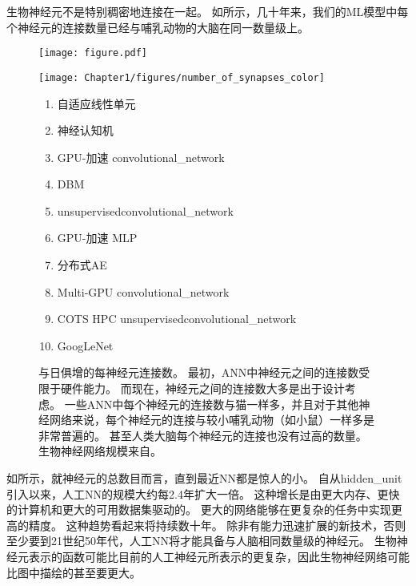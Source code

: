 生物神经元不是特别稠密地连接在一起。
如所示，几十年来，我们的\gls{ML}模型中每个神经元的连接数量已经与哺乳动物的大脑在同一数量级上。

\begin{figure}[!htb]
\ifOpenSource
\centerline{\texttt{[image: figure.pdf]}}
\else
\centerline{\texttt{[image: Chapter1/figures/number\_of\_synapses\_color]}}
\fi
\caption{与日俱增的每神经元连接数。 %
最初，\gls{ANN}中神经元之间的连接数受限于硬件能力。
而现在，神经元之间的连接数大多是出于设计考虑。
一些\gls{ANN}中每个神经元的连接数与猫一样多，并且对于其他神经网络来说，每个神经元的连接与较小哺乳动物（如小鼠）一样多是非常普遍的。
甚至人类大脑每个神经元的连接也没有过高的数量。
生物神经网络规模来自\citet{number_of_neurons}。
}
\label{fig:chap1_number_of_synapses_color}
{\tiny
\begin{enumerate}
  \itemsep0em
  \item %
    自适应线性单元~\citep{Widrow60}
  \item %
    神经认知机~\citep{Fukushima80}
  \item %
    GPU-加速 \gls{convolutional_network}~\citep{chellapilla:inria-00112631}
  \item %
    \gls{DBM}~\citep{SalHinton09}
  \item %
    \gls{unsupervised}\gls{convolutional_network}~\citep{Jarrett-ICCV2009-small}
  \item %
    GPU-加速 \gls{MLP}~\citep{Ciresan-2010}
  \item %
    分布式\gls{AE}~\citep{QuocLe-ICML2012}
  \item %
    Multi-GPU \gls{convolutional_network}~\citep{Krizhevsky-2012-small}
  \item %
    COTS HPC  \gls{unsupervised}\gls{convolutional_network}~\citep{icml2013_coates13}
  \item %
    GoogLeNet~\citep{Szegedy-et-al-arxiv2014}
\end{enumerate}
} %
\end{figure}

如所示，就神经元的总数目而言，直到最近\gls{NN}都是惊人的小。
自从\gls{hidden_unit}引入以来，人工\gls{NN}的规模大约每2.4年扩大一倍。
这种增长是由更大内存、更快的计算机和更大的可用数据集驱动的。
更大的网络能够在更复杂的任务中实现更高的精度。
这种趋势看起来将持续数十年。
除非有能力迅速扩展的新技术，否则至少要到21世纪50年代，人工\gls{NN}将才能具备与人脑相同数量级的神经元。
生物神经元表示的函数可能比目前的人工神经元所表示的更复杂，因此生物神经网络可能比图中描绘的甚至要更大。

